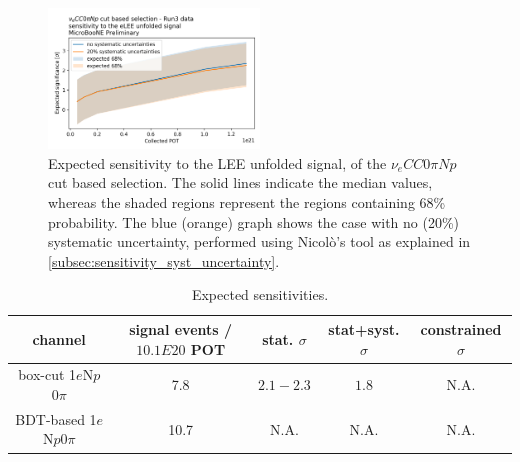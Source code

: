 \documentclass[a4paper]{article}
\newcommand{\nueccnopinp}{$\nu_e CC 0\pi Np$ }
\newcommand{\npsel}{1$e$N$p$0$\pi$ }
\begin{document}
\begin{figure}[H]
    \begin{center}
    \includegraphics[width=0.5\textwidth]{Sensitivity/sensitivity_vs_pot.png}
    \caption{Expected sensitivity to the LEE unfolded signal, of the \nueccnopinp cut based selection. The solid lines indicate the median values, whereas the shaded regions represent the regions containing 68\% probability.
    The blue (orange) graph shows the case with no (20\%) systematic uncertainty, performed using Nicol\`o's tool as explained in \ref{subsec:sensitivity_syst_uncertainty}.
    }
    \label{fig:sensitivity_function_pot}
    \end{center}
\end{figure}

\begin{table}[h!]
\centering
\setlength{\tabcolsep}{10pt}
\renewcommand{\arraystretch}{1.25}
 \begin{tabular}{| c | c | c | c | c |} 
 \hline
 channel & signal events / $10.1E20$ POT & stat. $\sigma$  & stat+syst. $\sigma$ & constrained $\sigma$ \\
 \hline
box-cut \npsel & 7.8 & $2.1-2.3$ & $1.8$ & N.A. \\
BDT-based \npsel & 10.7 & N.A. & N.A. & N.A. \\
 \hline
 \end{tabular}
 \caption{\label{tab:sensitivity}Expected sensitivities.}
\end{table}
\end{document}
